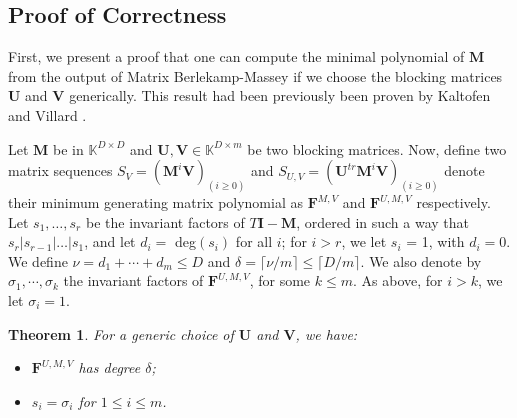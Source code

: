\documentclass[12pt]{article}
\newtheorem{theorem}[definition]{Theorem}
\def\mF{\mathbf{F}}
\def\mI{\mathbf{I}}
\def\mM{\mathbf{M}}
\def\mU{\mathbf{U}}
\def\mV{\mathbf{V}}
\begin{document}
\subsection{Proof of Correctness}

First, we present a proof that one can compute
the minimal polynomial of $\mM$ from the
output of Matrix Berlekamp-Massey if we choose
the blocking matrices $\mU$ and $\mV$ generically.
This result had been previously been proven by
Kaltofen and Villard \cite{KaVi04}\cite{Villard97a}.

Let $\mM$ be in $\mathbb{K}^{D \times D}$ and 
$\mU,\mV \in \mathbb{K}^{D \times m}$ be two blocking matrices. Now, define two matrix sequences
$S_V = (\mM^i \mV)_{(i \ge 0)}$ and 
$S_{U,V} = (\mU^{tr} \mM^i \mV)_{(i \ge 0)}$ denote their minimum
generating matrix polynomial as $\mF^{M,V}$ and $\mF^{U,M,V}$ respectively.
Let $s_1, \dots, s_r$ be the invariant factors
of $T\mI - \mM$, ordered in such a way that 
$s_r | s_{r-1}| \dots | s_1$, and let $d_i = $ deg$(s_i)$ for
all $i$; for $i > r$, we let $s_i$ = 1, with $d_i = 0$.
We define $\nu = d_1 + \cdots + d_m \le D$ and
$\delta = \lceil \nu / m \rceil \le \lceil D / m \rceil$.
We also denote by $\sigma_1, \cdots, \sigma_k$ the invariant
factors of $\mF^{U,M,V}$, for some $k \le m$. As above,
for $i > k$, we let $\sigma_i = 1$.

\begin{theorem}
	\label{randXY}
	For a generic choice of $\mU$ and $\mV$, we have:
	\begin{itemize}
		\item $\mF^{U,M,V}$ has degree $\delta$;
		\item $s_i = \sigma_i$ for $1 \le i \le m$.
	\end{itemize}
\end{theorem}
\end{document}
